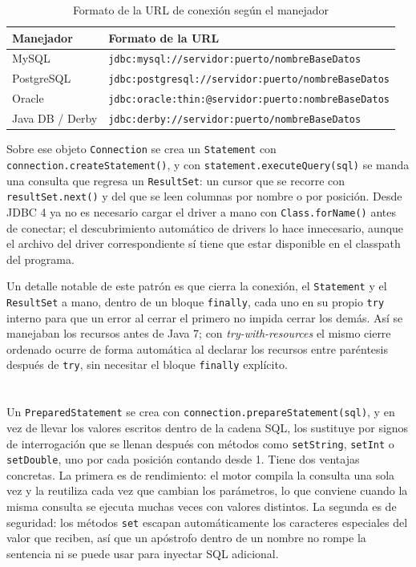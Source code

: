 \documentclass[10pt,a4paper]{article}
\begin{document}
\begin{table}[H]
	\centering
	\begin{tabular}{p{3.2cm} | p{9.5cm}}\hline \hline
		\textbf{Manejador} & \textbf{Formato de la URL} \\ \hline \hline
		MySQL & \texttt{jdbc:mysql://servidor:puerto/nombreBaseDatos} \\ \hline
		PostgreSQL & \texttt{jdbc:postgresql://servidor:puerto/nombreBaseDatos} \\ \hline
		Oracle & \texttt{jdbc:oracle:thin:@servidor:puerto:nombreBaseDatos} \\ \hline
		Java DB / Derby & \texttt{jdbc:derby://servidor:puerto/nombreBaseDatos} \\ \hline \hline
	\end{tabular}
	\caption{Formato de la URL de conexión según el manejador}
	\label{tabla:urls}
\end{table}

Sobre ese objeto \texttt{Connection} se crea un \texttt{Statement} con \texttt{connection.createStatement()}, y con \texttt{statement.executeQuery(sql)} se manda una consulta que regresa un \texttt{ResultSet}: un cursor que se recorre con \texttt{resultSet.next()} y del que se leen columnas por nombre o por posición. Desde JDBC 4 ya no es necesario cargar el driver a mano con \texttt{Class.forName()} antes de conectar; el descubrimiento automático de drivers lo hace innecesario, aunque el archivo del driver correspondiente sí tiene que estar disponible en el classpath del programa.

Un detalle notable de este patrón es que cierra la conexión, el \texttt{Statement} y el \texttt{ResultSet} a mano, dentro de un bloque \texttt{finally}, cada uno en su propio \texttt{try} interno para que un error al cerrar el primero no impida cerrar los demás. Así se manejaban los recursos antes de Java 7; con \textit{try-with-resources} el mismo cierre ordenado ocurre de forma automática al declarar los recursos entre paréntesis después de \texttt{try}, sin necesitar el bloque \texttt{finally} explícito.

\section{\color{colorIPN}{PreparedStatement}}

Un \texttt{PreparedStatement} se crea con \texttt{connection.prepareStatement(sql)}, y en vez de llevar los valores escritos dentro de la cadena SQL, los sustituye por signos de interrogación que se llenan después con métodos como \texttt{setString}, \texttt{setInt} o \texttt{setDouble}, uno por cada posición contando desde 1. Tiene dos ventajas concretas. La primera es de rendimiento: el motor compila la consulta una sola vez y la reutiliza cada vez que cambian los parámetros, lo que conviene cuando la misma consulta se ejecuta muchas veces con valores distintos. La segunda es de seguridad: los métodos \texttt{set} escapan automáticamente los caracteres especiales del valor que reciben, así que un apóstrofo dentro de un nombre no rompe la sentencia ni se puede usar para inyectar SQL adicional.
\end{document}
